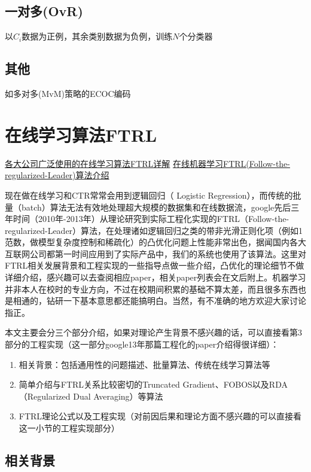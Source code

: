 \documentclass[10pt,a4paper]{ctexbook}
\begin{document}
\subsection{一对多(OvR)}
以$C_{i}$数据为正例，其余类别数据为负例，训练$N$个分类器

\subsection{其他}
如多对多(MvM)策略的ECOC编码


\section{在线学习算法FTRL}
\href{http://www.cnblogs.com/EE-NovRain/p/3810737.html}{各大公司广泛使用的在线学习算法FTRL详解}
\href{https://zhuanlan.zhihu.com/dataman/20447450}{在线机器学习FTRL(Follow-the-regularized-Leader)算法介绍}

现在做在线学习和CTR常常会用到逻辑回归（ Logistic Regression），而传统的批量（batch）算法无法有效地处理超大规模的数据集和在线数据流，google先后三年时间（2010年-2013年）从理论研究到实际工程化实现的FTRL（Follow-the-regularized-Leader）算法，在处理诸如逻辑回归之类的带非光滑正则化项（例如1范数，做模型复杂度控制和稀疏化）的凸优化问题上性能非常出色，据闻国内各大互联网公司都第一时间应用到了实际产品中，我们的系统也使用了该算法。这里对FTRL相关发展背景和工程实现的一些指导点做一些介绍，凸优化的理论细节不做详细介绍，感兴趣可以去查阅相应paper，相关paper列表会在文后附上。机器学习并非本人在校时的专业方向，不过在校期间积累的基础不算太差，而且很多东西也是相通的，钻研一下基本意思都还能搞明白。当然，有不准确的地方欢迎大家讨论指正。

本文主要会分三个部分介绍，如果对理论产生背景不感兴趣的话，可以直接看第3部分的工程实现（这一部分google13年那篇工程化的paper介绍得很详细）：
\begin{enumerate}
\item 相关背景：包括通用性的问题描述、批量算法、传统在线学习算法等
\item 简单介绍与FTRL关系比较密切的Truncated Gradient、FOBOS以及RDA（Regularized Dual Averaging）等算法
\item FTRL理论公式以及工程实现（对前因后果和理论方面不感兴趣的可以直接看这一小节的工程实现部分）
\end{enumerate}


\subsection{相关背景}
\end{document}
